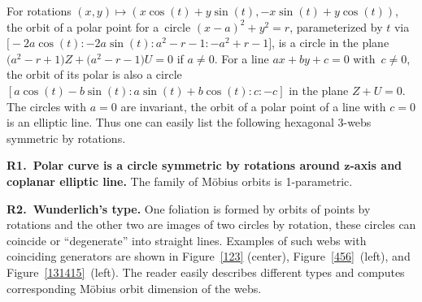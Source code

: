 \documentclass[pdftex]{sigma}
\numberwithin{equation}{section}
\begin{document}
 For rotations $(x,y)\mapsto (x\cos(t)+y\sin(t),-x\sin(t)+y\cos(t))$, the orbit of a polar point for a~circle $(x-a)^2+y^2=r$, parameterized by $t$ via $\bigl[-2a\cos(t):-2a\sin(t): a^2-r-1: -a^2+r-1\bigr]$, is a circle in the plane $\bigl(a^2-r+1\bigr)Z+\bigl(a^2-r-1\bigr)U=0$ if $a\ne 0$. For a line $ax+by+c=0$ with~${c\ne 0}$, the orbit of its polar is also a circle $[a\cos(t)-b\sin(t):a\sin(t)+b\cos(t):c:-c]$ in the plane $Z+U=0$. The circles with $a=0$ are invariant, the orbit of a polar point of a line with $c=0$ is an elliptic line.
Thus one can easily list the following hexagonal 3-webs symmetric by rotations.

 {\bf R1.\ Polar curve is a circle symmetric by rotations around $\boldsymbol{ z}$-axis and coplanar elliptic line.}
 The family of M\"obius orbits is 1-parametric.


 {\bf R2.\ Wunderlich's type.}
 One foliation is formed by orbits of points by rotations and the other two are images of two circles by rotation, these circles can coincide or ``degenerate'' into straight lines. Examples of such webs with coinciding generators are shown in Figure~\ref{123} (center), Figure~\ref{456}~(left), and Figure~\ref{131415}~(left). The reader easily describes different types and computes corresponding M\"obius orbit dimension of the webs.
\end{document}
